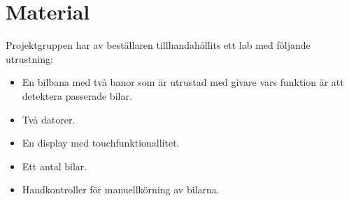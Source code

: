 \section{Material}

Projektgruppen har av beställaren tillhandahållits ett lab med följande utrustning:

\begin{itemize}
	\item En bilbana med två banor som är utrustad med givare vars funktion är att detektera passerade bilar.
	\item Två datorer.
	\item En display med touchfunktionallitet. 
	\item Ett antal bilar.
	\item Handkontroller för manuellkörning av bilarna.
\end{itemize}
